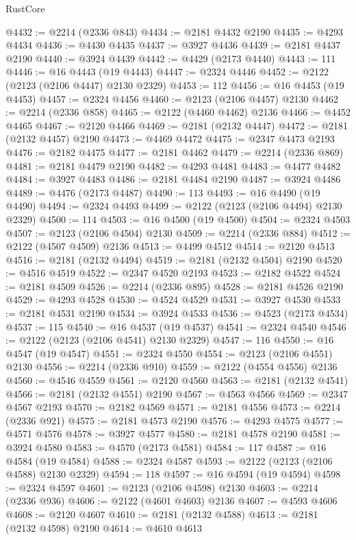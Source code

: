 \begin{lexlean}{RustCore}
\begin{coremodule}
@4432 := @2214 (@2336 @843)
@4434 := @2181 @4432 @2190
@4435 := @4293 @4434
@4436 := @4430 @4435
@4437 := @3927 @4436
@4439 := @2181 @4437 @2190
@4440 := @3924 @4439
@4442 := @4429 (@2173 @4440)
@4443 := 111
@4446 := @16 @4443 (@19 @4443)
@4447 := @2324 @4446
@4452 := @2122 (@2123 (@2106 @4447) @2130 @2329)
@4453 := 112
@4456 := @16 @4453 (@19 @4453)
@4457 := @2324 @4456
@4460 := @2123 (@2106 @4457) @2130
@4462 := @2214 (@2336 @858)
@4465 := @2122 (@4460 @4462) @2136
@4466 := @4452 @4465
@4467 := @2120 @4466
@4469 := @2181 (@2132 @4447)
@4472 := @2181 (@2132 @4457) @2190
@4473 := @4469 @4472
@4475 := @2347 @4473 @2193
@4476 := @2182 @4475
@4477 := @2181 @4462
@4479 := @2214 (@2336 @869)
@4481 := @2181 @4479 @2190
@4482 := @4293 @4481
@4483 := @4477 @4482
@4484 := @3927 @4483
@4486 := @2181 @4484 @2190
@4487 := @3924 @4486
@4489 := @4476 (@2173 @4487)
@4490 := 113
@4493 := @16 @4490 (@19 @4490)
@4494 := @2324 @4493
@4499 := @2122 (@2123 (@2106 @4494) @2130 @2329)
@4500 := 114
@4503 := @16 @4500 (@19 @4500)
@4504 := @2324 @4503
@4507 := @2123 (@2106 @4504) @2130
@4509 := @2214 (@2336 @884)
@4512 := @2122 (@4507 @4509) @2136
@4513 := @4499 @4512
@4514 := @2120 @4513
@4516 := @2181 (@2132 @4494)
@4519 := @2181 (@2132 @4504) @2190
@4520 := @4516 @4519
@4522 := @2347 @4520 @2193
@4523 := @2182 @4522
@4524 := @2181 @4509
@4526 := @2214 (@2336 @895)
@4528 := @2181 @4526 @2190
@4529 := @4293 @4528
@4530 := @4524 @4529
@4531 := @3927 @4530
@4533 := @2181 @4531 @2190
@4534 := @3924 @4533
@4536 := @4523 (@2173 @4534)
@4537 := 115
@4540 := @16 @4537 (@19 @4537)
@4541 := @2324 @4540
@4546 := @2122 (@2123 (@2106 @4541) @2130 @2329)
@4547 := 116
@4550 := @16 @4547 (@19 @4547)
@4551 := @2324 @4550
@4554 := @2123 (@2106 @4551) @2130
@4556 := @2214 (@2336 @910)
@4559 := @2122 (@4554 @4556) @2136
@4560 := @4546 @4559
@4561 := @2120 @4560
@4563 := @2181 (@2132 @4541)
@4566 := @2181 (@2132 @4551) @2190
@4567 := @4563 @4566
@4569 := @2347 @4567 @2193
@4570 := @2182 @4569
@4571 := @2181 @4556
@4573 := @2214 (@2336 @921)
@4575 := @2181 @4573 @2190
@4576 := @4293 @4575
@4577 := @4571 @4576
@4578 := @3927 @4577
@4580 := @2181 @4578 @2190
@4581 := @3924 @4580
@4583 := @4570 (@2173 @4581)
@4584 := 117
@4587 := @16 @4584 (@19 @4584)
@4588 := @2324 @4587
@4593 := @2122 (@2123 (@2106 @4588) @2130 @2329)
@4594 := 118
@4597 := @16 @4594 (@19 @4594)
@4598 := @2324 @4597
@4601 := @2123 (@2106 @4598) @2130
@4603 := @2214 (@2336 @936)
@4606 := @2122 (@4601 @4603) @2136
@4607 := @4593 @4606
@4608 := @2120 @4607
@4610 := @2181 (@2132 @4588)
@4613 := @2181 (@2132 @4598) @2190
@4614 := @4610 @4613

\end{coremodule}
\end{lexlean}
